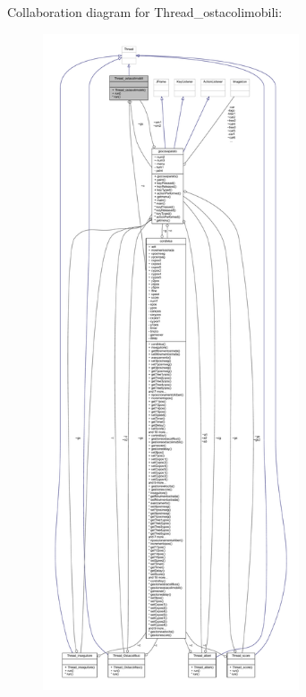 Collaboration diagram for Thread\+\_\+ostacolimobili\+:
\nopagebreak
\begin{figure}[H]
\begin{center}
\leavevmode
\includegraphics[height=550pt]{classcargame_1_1_thread__ostacolimobili__coll__graph}
\end{center}
\end{figure}
